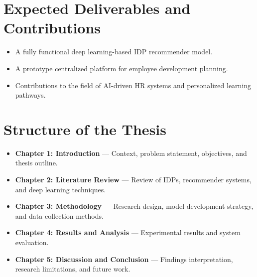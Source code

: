 \section{Expected Deliverables and Contributions}
\begin{itemize}
    \item A fully functional deep learning-based IDP recommender model.
    \item A prototype centralized platform for employee development planning.
    \item Contributions to the field of AI-driven HR systems and personalized learning pathways.
\end{itemize}

\section{Structure of the Thesis}
\begin{itemize}
    \item \textbf{Chapter 1: Introduction} — Context, problem statement, objectives, and thesis outline.
    \item \textbf{Chapter 2: Literature Review} — Review of IDPs, recommender systems, and deep learning techniques.
    \item \textbf{Chapter 3: Methodology} — Research design, model development strategy, and data collection methods.
    \item \textbf{Chapter 4: Results and Analysis} — Experimental results and system evaluation.
    \item \textbf{Chapter 5: Discussion and Conclusion} — Findings interpretation, research limitations, and future work.
\end{itemize}
